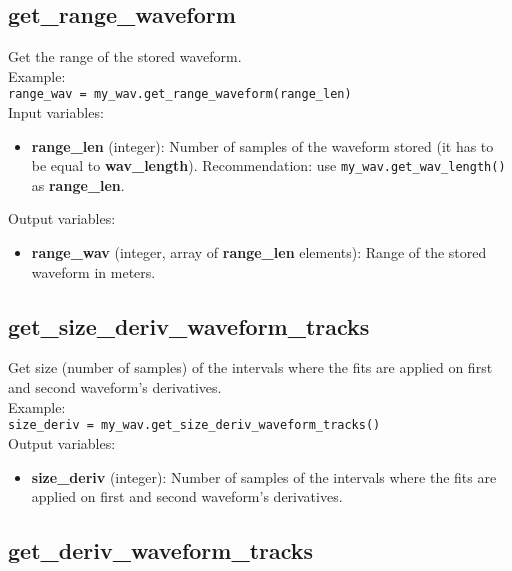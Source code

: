\subsection{get\_range\_waveform}

Get the range of the stored waveform.\\

Example:\\

\texttt{range\_wav = my\_wav.get\_range\_waveform(range\_len)}\\

Input variables:
\begin{itemize}
\item {\bf range\_len} (integer): Number of samples of the waveform stored (it has to be equal to {\bf wav\_length}). Recommendation: use \texttt{my\_wav.get\_wav\_length()} as {\bf range\_len}.
\end{itemize}

Output variables:
\begin{itemize}
\item {\bf range\_wav} (integer, array of {\bf range\_len} elements): Range of the stored waveform in meters.
\end{itemize}


\subsection{get\_size\_deriv\_waveform\_tracks}

Get size (number of samples) of the intervals where the fits are applied on first and second waveform's derivatives.\\

Example:\\

\texttt{size\_deriv = my\_wav.get\_size\_deriv\_waveform\_tracks()}\\

Output variables:
\begin{itemize}
\item {\bf size\_deriv} (integer): Number of samples of the intervals where the fits are applied on first and second waveform's derivatives.
\end{itemize}


\subsection{get\_deriv\_waveform\_tracks}

